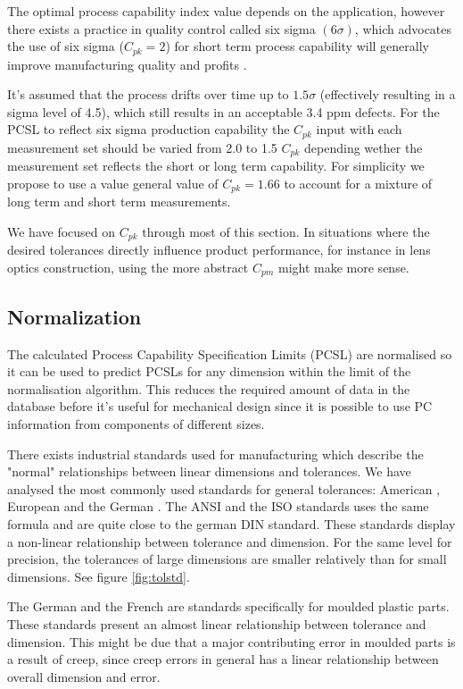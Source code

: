 \documentclass[aip,amsmath, reprint, author-year]{revtex4-1}
\begin{document}
The optimal process capability index value depends on the application, however there exists a practice in quality control called six sigma $(6 \sigma)$, which advocates the use of six sigma ($C_{pk} = 2$) for short term process capability will generally improve manufacturing quality and profits \cite{koch2004design}. 

It's assumed that the process drifts over time up to $1.5 \sigma$  (effectively resulting in a sigma level of 4.5), which still results in an acceptable 3.4 ppm defects.
For the PCSL to reflect six sigma production capability the $C_{pk}$ input with each measurement set should be varied from 2.0 to 1.5 $C_{pk}$ depending wether the measurement set reflects the short or long term capability. 
For simplicity we propose to use a value general value of $C_{pk} = 1.66$ to account for a  mixture of long term and short term measurements. 

We have focused on $C_{pk}$ through most of this section.
In situations where the desired tolerances directly influence product performance, for instance in lens optics construction, using the more abstract $C_{pm}$ might make more sense. 


\subsection{Normalization}
The calculated Process Capability Specification Limits (PCSL) are normalised so it can be used to predict PCSLs for any dimension within the limit of the normalisation algorithm. 
This reduces the required amount of data in the database before it's useful for mechanical design since it is possible to use PC information from components of different sizes.

There exists industrial standards used for manufacturing which describe the "normal" relationships between linear dimensions and tolerances. We have analysed the most commonly used standards for general tolerances: American \citeauthor{american1978preferred}, European \citeauthor{ISO286} and the German \citeauthor{DIN7168}. The ANSI and the ISO standards uses the same formula and are quite close to the german DIN standard. 
These standards display a non-linear relationship between tolerance and dimension. For the same level for precision, the tolerances of large dimensions are smaller relatively than for small dimensions. See figure \ref{fig:tolstd}.

The German \citeauthor{DIN16901} and the French \citeauthor{NFT58000} are standards specifically for moulded plastic parts. These standards present an almost linear relationship between tolerance and dimension. This might be due that a major contributing error in moulded parts is a result of creep, since creep errors in general has a linear relationship between overall dimension and error.
\end{document}
